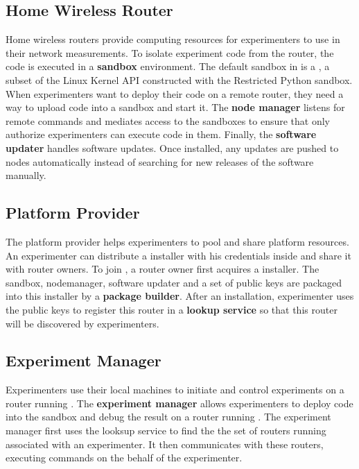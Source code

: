 \subsection{Home Wireless Router}
Home wireless routers provide computing resources for experimenters to use in their network measurements. To isolate experiment code from the router, the code is executed in a \textbf{sandbox} environment. The default sandbox in \sysname is a \sandboxname, a subset of the Linux Kernel API constructed with the Restricted Python sandbox. When experimenters want to deploy their code on a remote router, they need a way to upload code into a sandbox and start it. The \textbf{node manager} listens for remote commands and mediates access to the sandboxes to ensure that only authorize experimenters can execute code in them. Finally, the \textbf{software updater} handles software updates. Once installed, any updates are pushed to nodes automatically instead of searching for new releases of the software manually.  

\subsection{Platform Provider}
The platform provider helps experimenters to pool and share platform resources. An experimenter can distribute a \sysname installer with his credentials inside and share it with router owners. To join \sysname, a router owner first acquires a \sysname installer. The sandbox, nodemanager, software updater and a set of public keys are packaged into this installer by a \textbf{package builder}. After an installation, experimenter uses the public keys to register this router in a \textbf{lookup service} so that this router will be discovered by experimenters.

\subsection{Experiment Manager}
Experimenters use their local machines to initiate and control experiments on a router running \sysname. The \textbf{experiment manager} allows experimenters to deploy code into the sandbox and debug the result on a router running \sysname. The experiment manager first uses the looksup service to find the the set of routers running \sysname associated with an experimenter. It then communicates with these routers, executing commands on the behalf of the experimenter.  

